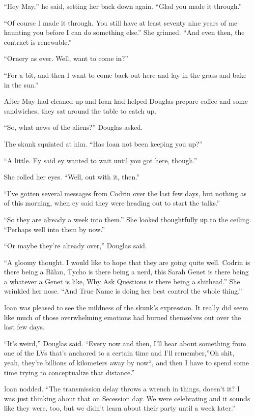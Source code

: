 ``Hey May,'' he said, setting her back down again. ``Glad you made it through.''

``Of course I made it through. You still have at least seventy nine years of me haunting you before I can do something else.'' She grinned. ``And even then, the contract is renewable.''

``Ornery as ever. Well, want to come in?''

``For a bit, and then I want to come back out here and lay in the grass and bake in the sun.''

After May had cleaned up and Ioan had helped Douglas prepare coffee and some sandwiches, they sat around the table to catch up.

``So, what news of the aliens?'' Douglas asked.

The skunk squinted at him. ``Has Ioan not been keeping you up?''

``A little. Ey said ey wanted to wait until you got here, though.''

She rolled her eyes. ``Well, out with it, then.''

``I've gotten several messages from Codrin over the last few days, but nothing as of this morning, when ey said they were heading out to start the talks.''

``So they are already a week into them.'' She looked thoughtfully up to the ceiling. ``Perhaps well into them by now.''

``Or maybe they're already over,'' Douglas said.

``A gloomy thought. I would like to hope that they are going quite well. Codrin is there being a Bălan, Tycho is there being a nerd, this Sarah Genet is there being a whatever a Genet is like, Why Ask Questions is there being a shithead.'' She wrinkled her nose. ``And True Name is doing her best control the whole thing.''

Ioan was pleased to see the mildness of the skunk's expression. It really did seem like much of those overwhelming emotions had burned themselves out over the last few days.

``It's weird,'' Douglas said. ``Every now and then, I'll hear about something from one of the LVs that's anchored to a certain time and I'll remember,''Oh shit, yeah, they're billions of kilometers away by now``, and then I have to spend some time trying to conceptualize that distance.''

Ioan nodded. ``The transmission delay throws a wrench in things, doesn't it? I was just thinking about that on Secession day. We were celebrating and it sounds like they were, too, but we didn't learn about their party until a week later.''

